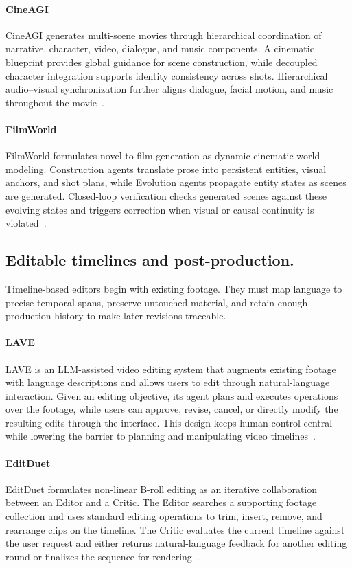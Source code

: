 \paragraph{CineAGI}
CineAGI generates multi-scene movies through hierarchical coordination of narrative, character, video, dialogue, and music components. A cinematic blueprint provides global guidance for scene construction, while decoupled character integration supports identity consistency across shots. Hierarchical audio--visual synchronization further aligns dialogue, facial motion, and music throughout the movie~\cite{avg260423579}.

\paragraph{FilmWorld}
FilmWorld formulates novel-to-film generation as dynamic cinematic world modeling. Construction agents translate prose into persistent entities, visual anchors, and shot plans, while Evolution agents propagate entity states as scenes are generated. Closed-loop verification checks generated scenes against these evolving states and triggers correction when visual or causal continuity is violated~\cite{avg260719038}.

\subsection{Editable timelines and post-production.}
Timeline-based editors begin with existing footage. They must map language to precise temporal spans, preserve untouched material, and retain enough production history to make later revisions traceable.

\paragraph{LAVE}
LAVE is an LLM-assisted video editing system that augments existing footage with language descriptions and allows users to edit through natural-language interaction. Given an editing objective, its agent plans and executes operations over the footage, while users can approve, revise, cancel, or directly modify the resulting edits through the interface. This design keeps human control central while lowering the barrier to planning and manipulating video timelines~\cite{wang2024lave}.

\paragraph{EditDuet}
EditDuet formulates non-linear B-roll editing as an iterative collaboration between an Editor and a Critic. The Editor searches a supporting footage collection and uses standard editing operations to trim, insert, remove, and rearrange clips on the timeline. The Critic evaluates the current timeline against the user request and either returns natural-language feedback for another editing round or finalizes the sequence for rendering~\cite{avg250910761}.

